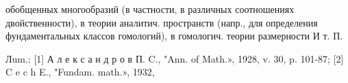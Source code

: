 \documentclass[10pt]{article}
\begin{document}
обобщенных многообразий (в частности, в различных соотношениях двойственности), в теории аналитич. пространств (напр., для определения фундаментальных классов гомологий), в гомологич. теории размерности И т. П.



Лum.: [1] А л е к с а н д р о в П. C., "Ann. of Math.», 1928, v. 30, p. 101-87; [2] C e c h E., "Fundam. math.», 1932,
\end{document}
